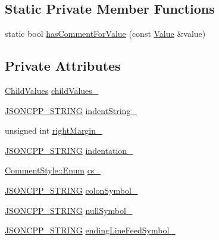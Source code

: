 \subsection*{Static Private Member Functions}
\begin{DoxyCompactItemize}
\item 
static bool \hyperlink{struct_json_1_1_built_styled_stream_writer_a457c2f3c1e8c952caeb60e52477d0c9a}{has\+Comment\+For\+Value} (const \hyperlink{class_json_1_1_value}{Value} \&value)
\end{DoxyCompactItemize}
\subsection*{Private Attributes}
\begin{DoxyCompactItemize}
\item 
\hyperlink{struct_json_1_1_built_styled_stream_writer_a63196b38400e5ce452f65ce856d47b6f}{Child\+Values} \hyperlink{struct_json_1_1_built_styled_stream_writer_a47d562d7874c5b1e68995bd62f575792}{child\+Values\+\_\+}
\item 
\hyperlink{json_8h_a1e723f95759de062585bc4a8fd3fa4be}{J\+S\+O\+N\+C\+P\+P\+\_\+\+S\+T\+R\+I\+NG} \hyperlink{struct_json_1_1_built_styled_stream_writer_a0f8115a4fb474ab0e9de25f10e5ca09a}{indent\+String\+\_\+}
\item 
unsigned int \hyperlink{struct_json_1_1_built_styled_stream_writer_a06a51521ccae20397f52fe3036edc602}{right\+Margin\+\_\+}
\item 
\hyperlink{json_8h_a1e723f95759de062585bc4a8fd3fa4be}{J\+S\+O\+N\+C\+P\+P\+\_\+\+S\+T\+R\+I\+NG} \hyperlink{struct_json_1_1_built_styled_stream_writer_aaa4cbad91428ceca37cbabfc2a17a92d}{indentation\+\_\+}
\item 
\hyperlink{struct_json_1_1_comment_style_a51fc08f3518fd81eba12f340d19a3d0c}{Comment\+Style\+::\+Enum} \hyperlink{struct_json_1_1_built_styled_stream_writer_a89a9c76c7531143b52785861ba21c1d4}{cs\+\_\+}
\item 
\hyperlink{json_8h_a1e723f95759de062585bc4a8fd3fa4be}{J\+S\+O\+N\+C\+P\+P\+\_\+\+S\+T\+R\+I\+NG} \hyperlink{struct_json_1_1_built_styled_stream_writer_a9f10991ddef9b77d0b580e24e71483c6}{colon\+Symbol\+\_\+}
\item 
\hyperlink{json_8h_a1e723f95759de062585bc4a8fd3fa4be}{J\+S\+O\+N\+C\+P\+P\+\_\+\+S\+T\+R\+I\+NG} \hyperlink{struct_json_1_1_built_styled_stream_writer_a6ccceadf4b1286a519a175cb59cb61d5}{null\+Symbol\+\_\+}
\item 
\hyperlink{json_8h_a1e723f95759de062585bc4a8fd3fa4be}{J\+S\+O\+N\+C\+P\+P\+\_\+\+S\+T\+R\+I\+NG} \hyperlink{struct_json_1_1_built_styled_stream_writer_a5e61a9a4b2af52b98900286c843b86f7}{ending\+Line\+Feed\+Symbol\+\_\+}

\end{DoxyCompactItemize}
